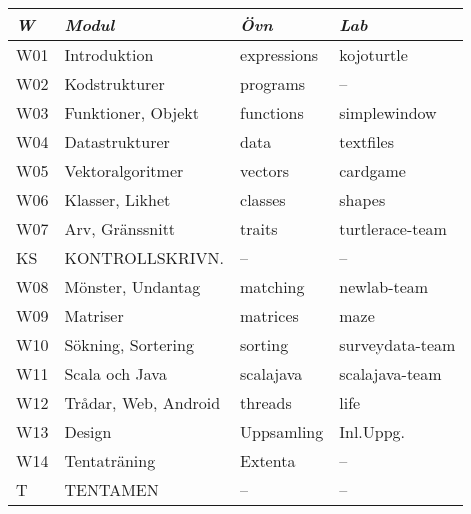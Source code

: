 \begin{tabular}{l|l|l|l}
\textit{W} & \textit{Modul} & \textit{Övn} & \textit{Lab} \\ \hline \hline
W01 & Introduktion         & expressions & kojoturtle      \\
W02 & Kodstrukturer        & programs    & --              \\
W03 & Funktioner, Objekt   & functions   & simplewindow    \\
W04 & Datastrukturer       & data        & textfiles       \\
W05 & Vektoralgoritmer     & vectors     & cardgame        \\
W06 & Klasser, Likhet      & classes     & shapes          \\
W07 & Arv, Gränssnitt      & traits      & turtlerace-team \\
KS  & KONTROLLSKRIVN.      & --          & --              \\
W08 & Mönster, Undantag    & matching    & newlab-team     \\
W09 & Matriser             & matrices    & maze            \\
W10 & Sökning, Sortering   & sorting     & surveydata-team \\
W11 & Scala och Java       & scalajava   & scalajava-team  \\
W12 & Trådar, Web, Android & threads     & life            \\
W13 & Design               & Uppsamling  & Inl.Uppg.       \\
W14 & Tentaträning         & Extenta     & --              \\
T   & TENTAMEN             & --          & --              \\
\end{tabular}
